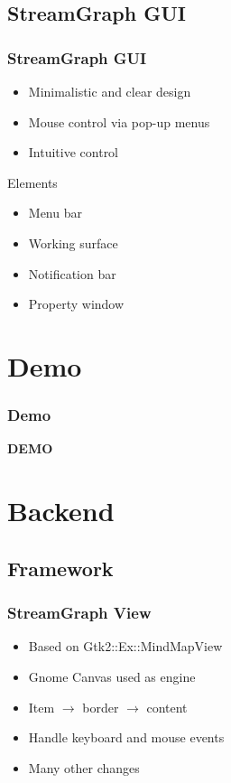 \documentclass{beamer}
\begin{document}
\subsection{StreamGraph GUI}
\begin{frame}
\frametitle{StreamGraph GUI}
	\begin{itemize}
		\item Minimalistic and clear design
		\item Mouse control via pop-up menus
		\item Intuitive control
	\end{itemize}
	\begin{block}{Elements}
		\begin{itemize}
			\item Menu bar
			\item Working surface
			\item Notification bar
			\item Property window
		\end{itemize}
	\end{block}
\end{frame}


\section{Demo}
\begin{frame}
\frametitle{Demo}
\textbf{DEMO}
\end{frame}


\section{Backend}

\subsection{Framework}
\begin{frame}
\frametitle{StreamGraph View}
 \begin{itemize}
 	\item Based on Gtk2::Ex::MindMapView \cite{GTK2EXMindMapView}
	\item Gnome Canvas used as engine
	\item Item $\rightarrow$ border $\rightarrow$ content
	\item Handle keyboard and mouse events
	\item Many other changes
 \end{itemize}
\end{frame}
\end{document}
